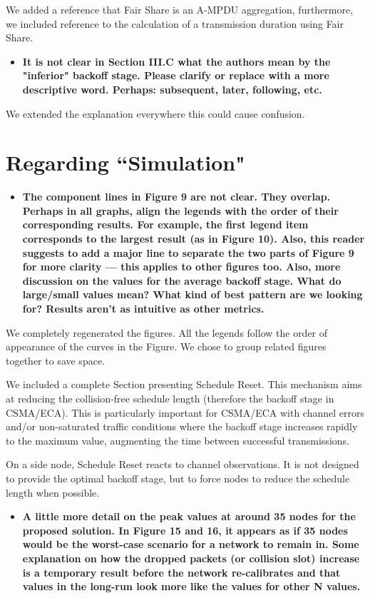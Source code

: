 \documentclass[]{article}
\begin{document}
		We added a reference that Fair Share is an A-MPDU aggregation, furthermore, we included reference to the calculation of a transmission duration using Fair Share. 		
		
		\begin{itemize}
			\item {\bfseries It is not clear in Section III.C what the authors mean by the "inferior" backoff stage. Please clarify or replace with a more descriptive word. Perhaps: subsequent, later, following, etc.}
		\end{itemize}
		
		We extended the explanation everywhere this could cause confusion. 
		
	\section{Regarding ``Simulation"}
		\begin{itemize}
			\item {\bfseries The component lines in Figure 9 are not clear. They overlap. Perhaps in all graphs, align the legends with the order of their corresponding results. For example, the first legend item corresponds to the largest result (as in Figure 10). Also, this reader suggests to add a major line to separate the two parts of Figure 9 for more clarity --- this applies to other figures too. Also, more discussion on the values for the average backoff stage. What do large/small values mean? What kind of best pattern are we looking for? Results aren't as intuitive as other metrics.}
		\end{itemize}
		
		We completely regenerated the figures. All the legends follow the order of appearance of the curves in the Figure. We chose to group related figures together to save space.
		
		We included a complete Section presenting Schedule Reset. This mechanism aims at reducing the collision-free schedule length (therefore the backoff stage in CSMA/ECA). This is particularly important for CSMA/ECA with channel errors and/or non-saturated traffic conditions where the backoff stage increases rapidly to the maximum value, augmenting the time between successful transmissions.
		
		On a side node, Schedule Reset reacts to channel observations. It is not designed to provide the optimal backoff stage, but to force nodes to reduce the schedule length when possible.
		
		\begin{itemize}
			\item {\bf A little more detail on the peak values at around 35 nodes for the proposed solution. In Figure 15 and 16, it appears as if 35 nodes would be the worst-case scenario for a network to remain in. Some explanation on how the dropped packets (or collision slot) increase is a temporary result before the network re-calibrates and that values in the long-run look more like the values for other N values.}
		\end{itemize}
		
\end{document}
